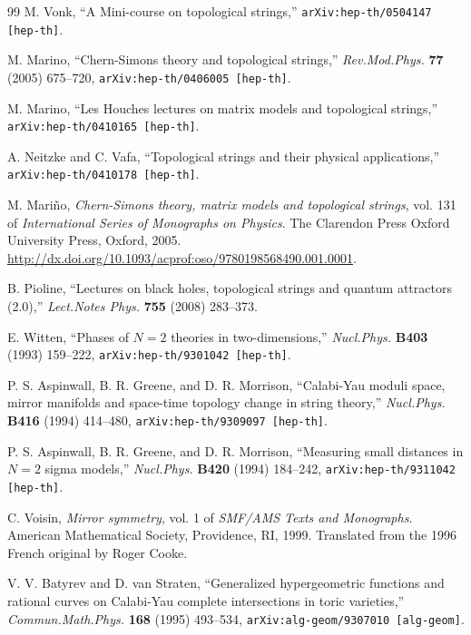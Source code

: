 \begin{thebibliography}{99}
M. Vonk, ``A Mini-course on topological strings,''
\texttt{arXiv:hep-th/0504147 [hep-th]}.

M. Marino, ``Chern-Simons theory and topological strings,'' \textit{Rev.Mod.Phys.}
\textbf{77} (2005) 675--720, \texttt{arXiv:hep-th/0406005 [hep-th]}.

M. Marino, ``Les Houches lectures on matrix models and topological strings,''
\texttt{arXiv:hep-th/0410165 [hep-th]}.


A. Neitzke and C. Vafa, ``Topological strings and their physical applications,''
\texttt{arXiv:hep-th/0410178 [hep-th]}.

M. Mari\~no, \textit{Chern-Simons theory, matrix models and topological strings}, vol. 131
of \textit{International Series of Monographs on Physics}. The Clarendon Press Oxford
University Press, Oxford, 2005.
\url{http://dx.doi.org/10.1093/acprof:oso/9780198568490.001.0001}.

B. Pioline, ``Lectures on black holes, topological strings and quantum attractors (2.0),''
\textit{Lect.Notes Phys.} \textbf{755} (2008) 283--373.

E. Witten, ``Phases of $N=2$ theories in two-dimensions,'' \textit{Nucl.Phys.}
\textbf{B403} (1993) 159--222, \texttt{arXiv:hep-th/9301042 [hep-th]}.

P. S. Aspinwall, B. R. Greene, and D. R. Morrison, ``Calabi-Yau moduli space, mirror
manifolds and space-time topology change in string theory,'' \textit{Nucl.Phys.}
\textbf{B416} (1994) 414--480, \texttt{arXiv:hep-th/9309097 [hep-th]}.

P. S. Aspinwall, B. R. Greene, and D. R. Morrison, ``Measuring small distances in $N=2$
sigma models,'' \textit{Nucl.Phys.} \textbf{B420} (1994) 184--242,
\texttt{arXiv:hep-th/9311042 [hep-th]}.

C. Voisin, \textit{Mirror symmetry}, vol. 1 of \textit{SMF/AMS Texts and Monographs}.
American Mathematical Society, Providence, RI, 1999. Translated from the 1996 French
original by Roger Cooke.

V. V. Batyrev and D. van Straten, ``Generalized hypergeometric functions and rational
curves on Calabi-Yau complete intersections in toric varieties,''
\textit{Commun.Math.Phys.} \textbf{168} (1995) 493--534,
\texttt{arXiv:alg-geom/9307010 [alg-geom]}.


\end{thebibliography}

